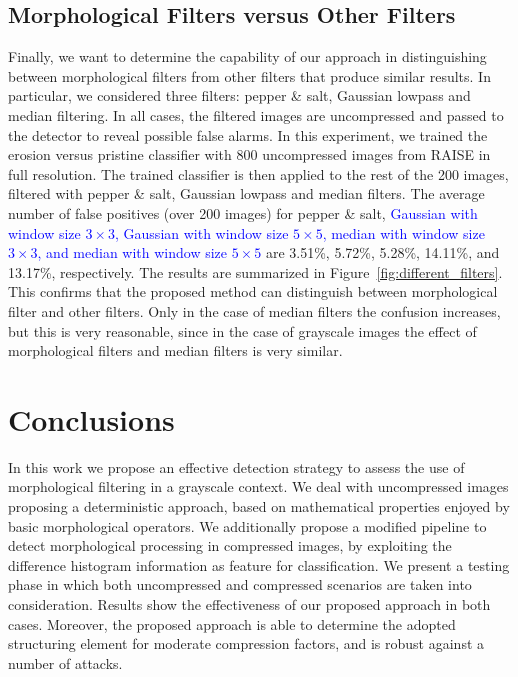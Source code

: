 \documentclass{ieeeaccess}
\begin{document}
\subsection{Morphological Filters versus Other Filters }
\label{subsec:results_different_filters}

Finally, we want to determine the capability of our approach in distinguishing between morphological filters from other filters that produce similar results. In particular, we considered three filters: pepper \& salt, Gaussian lowpass and median filtering. In all cases, the filtered images are uncompressed and passed to the detector to reveal possible false alarms. 
In this experiment, we trained the erosion versus pristine classifier with 800 uncompressed images from RAISE in full resolution. The trained classifier is then applied to the rest of the 200 images, filtered with pepper \& salt, Gaussian lowpass and median filters. The average number of false positives (over 200 images) for pepper \& salt, \textcolor{blue}{ Gaussian with window size $3 \times 3$, Gaussian with window size $5 \times 5$, median with window size $3 \times 3$, and median with window size $5 \times 5$} are 3.51\%, 5.72\%, 5.28\%, 14.11\%, and 13.17\%, respectively. The results are summarized in Figure~\ref{fig:different_filters}.  
This confirms that the proposed method can distinguish between morphological filter and other filters. Only in the case of median filters the confusion increases, but this is very reasonable, since in the case of grayscale images the effect of morphological filters and median filters is very similar.


\section{Conclusions}
\label{sec:conclusions}
In this work we propose an effective detection strategy to assess the use of morphological filtering in a grayscale context. We deal with uncompressed images proposing a deterministic approach, based on mathematical properties enjoyed by basic morphological operators. We additionally propose a modified pipeline to detect morphological processing in compressed images, by exploiting the difference histogram information as feature for  classification. We present a testing phase in which both uncompressed and compressed scenarios are taken into consideration. Results show the effectiveness of our proposed approach in both cases. Moreover, the proposed approach is able to determine the adopted structuring element for moderate compression factors, and is robust against a number of attacks.
\end{document}
